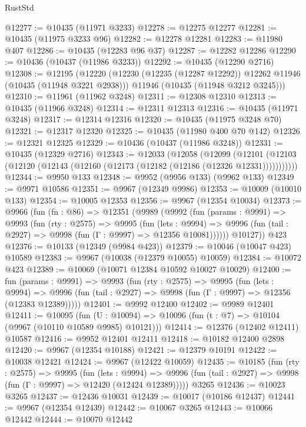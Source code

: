 \begin{lexlean}{RustStd}
\begin{coremodule}
{\begin{coremodule}
{{{{{{{{{{{{{{{{{{{{{{{{{{{{{{{{{{{{{{{{{{{{{{{{{{{{{{{{{{{{{{{{{{{{{{{{{{{{{{@12277 := @10435 (@11971 @3233)
@12278 := @12275 @12277
@12281 := @10435 (@11975 @3233 @96)
@12282 := @12278 @12281
@12283 := @11980 @407
@12286 := @10435 (@12283 @96 @37)
@12287 := @12282 @12286
@12290 := @10436 (@10437 (@11986 @3233))
@12292 := @10435 (@12290 @2716)
@12308 := @12195
    (@12220
      (@12230 (@12235 (@12287 @12292)) @12262 @11946 (@10435 (@11948 @3221 @2938)))
      @11946
      (@10435 (@11948 @3212 @3245)))
@12310 := @11961 (@11962 @3248)
@12311 := @12308 @12310
@12313 := @10435 (@11966 @3248)
@12314 := @12311 @12313
@12316 := @10435 (@11971 @3248)
@12317 := @12314 @12316
@12320 := @10435 (@11975 @3248 @70)
@12321 := @12317 @12320
@12325 := @10435 (@11980 @400 @70 @142)
@12326 := @12321 @12325
@12329 := @10436 (@10437 (@11986 @3248))
@12331 := @10435 (@12329 @2716)
@12343 := @12033
    (@12058
      (@12099
        (@12101 (@12103 (@12120 (@12143 (@12160 (@12173 (@12182 (@12186 (@12326 @12331)))))))))))
@12344 := @9950 @133
@12348 := @9952 (@9956 @133) (@9962 @133)
@12349 := @9971 @10586
@12351 := @9967 (@12349 @9986)
@12353 := @10009 (@10010 @133)
@12354 := @10005 @12353
@12356 := @9967 (@12354 @10034)
@12373 := @9966
    (fun (fn : @86) =>
    @12351
      (@9989
        (@9992
          (fun (params : @9991) =>
          @9993
            (fun (rty : @2575) =>
            @9995
              (fun (lets : @9994) =>
              @9996 (fun (tail : @2927) => @9998 (fun (Γ : @9997) => @12356 @10081))))))
        @10127))
    @423
@12376 := @10133 (@12349 (@9984 @423))
@12379 := @10046 (@10047 @423) @10589
@12383 := @9967 (@10038 (@12379 @10055) @10059)
@12384 := @10072 @423
@12389 := @10069 (@10071 @12384 @10592 @10027 @10029)
@12400 := fun (params : @9991) =>
  @9993
    (fun (rty : @2575) =>
    @9995
      (fun (lets : @9994) =>
      @9996 (fun (tail : @2927) => @9998 (fun (Γ : @9997) => @12356 (@12383 @12389)))))
@12401 := @9992 @12400
@12402 := @9989 @12401
@12411 := @10095
    (fun (U : @10094) => @10096 (fun (t : @7) => @10104 (@9967 (@10110 @10589 @9985) @10121)))
@12414 := @12376 (@12402 @12411) @10587
@12416 := @9952 @12401 @12411
@12418 := @10182 @12400 @2898
@12420 := @9967 (@12354 @10188)
@12421 := @12379 @10191
@12422 := @10038 @12421
@12424 := @9967 (@12422 @10059)
@12435 := @10185
    (fun (rty : @2575) =>
    @9995
      (fun (lets : @9994) =>
      @9996 (fun (tail : @2927) => @9998 (fun (Γ : @9997) => @12420 (@12424 @12389)))))
    @3265
@12436 := @10023 @3265
@12437 := @12436 @10031
@12439 := @10017 (@10186 @12437)
@12441 := @9967 (@12354 @12439)
@12442 := @10067 @3265
@12443 := @10066 @12442
@12444 := @10070 @12442
}}}}}}}}}}}}}}}}}}}}}}}}}}}}}}}}}}}}}}}}}}}}}}}}}}}}}}}}}}}}}}}}}}}}}}}}}}}}}}
\end{coremodule}}
\end{coremodule}
\end{lexlean}
